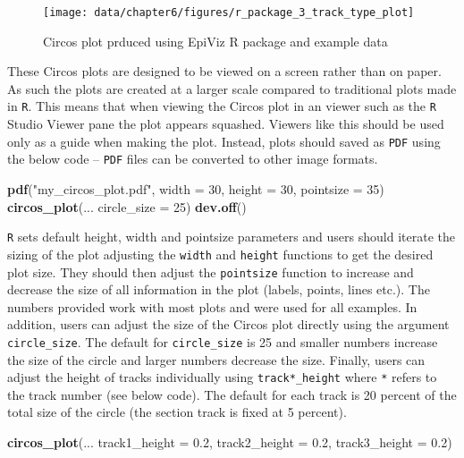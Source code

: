 \documentclass[11pt,twoside]{bristolthesis}
\newenvironment{Shaded}{\begin{snugshade}}{\end{snugshade}}
\newcommand{\DataTypeTok}[1]{\textcolor[rgb]{0.13,0.29,0.53}{#1}}
\newcommand{\DecValTok}[1]{\textcolor[rgb]{0.00,0.00,0.81}{#1}}
\newcommand{\FloatTok}[1]{\textcolor[rgb]{0.00,0.00,0.81}{#1}}
\newcommand{\KeywordTok}[1]{\textcolor[rgb]{0.13,0.29,0.53}{\textbf{#1}}}
\newcommand{\NormalTok}[1]{#1}
\newcommand{\StringTok}[1]{\textcolor[rgb]{0.31,0.60,0.02}{#1}}
\begin{document}
\begin{figure}
\texttt{[image: data/chapter6/figures/r\_package\_3\_track\_type\_plot]} \caption{Circos plot prduced using EpiViz R package and example data}\label{fig:r-package-3-track-type-plot}
\end{figure}
These Circos plots are designed to be viewed on a screen rather than on paper. As such the plots are created at a larger scale compared to traditional plots made in \texttt{R}. This means that when viewing the Circos plot in an viewer such as the \texttt{R} Studio Viewer pane the plot appears squashed. Viewers like this should be used only as a guide when making the plot. Instead, plots should saved as \texttt{PDF} using the below code -- \texttt{PDF} files can be converted to other image formats.
\begin{Shaded}
\begin{Highlighting}[]
\KeywordTok{pdf}\NormalTok{(}\StringTok{"my_circos_plot.pdf"}\NormalTok{,}
    \DataTypeTok{width =} \DecValTok{30}\NormalTok{, }\DataTypeTok{height =} \DecValTok{30}\NormalTok{, }\DataTypeTok{pointsize =} \DecValTok{35}\NormalTok{)}
\KeywordTok{circos_plot}\NormalTok{(...}
            \DataTypeTok{circle_size =} \DecValTok{25}\NormalTok{)}
\KeywordTok{dev.off}\NormalTok{()}
\end{Highlighting}
\end{Shaded}
\texttt{R} sets default height, width and pointsize parameters and users should iterate the sizing of the plot adjusting the \texttt{width} and \texttt{height} functions to get the desired plot size. They should then adjust the \texttt{pointsize} function to increase and decrease the size of all information in the plot (labels, points, lines etc.). The numbers provided work with most plots and were used for all examples. In addition, users can adjust the size of the Circos plot directly using the argument \texttt{circle\_size}. The default for \texttt{circle\_size} is 25 and smaller numbers increase the size of the circle and larger numbers decrease the size. Finally, users can adjust the height of tracks individually using \texttt{track*\_height} where \texttt{*} refers to the track number (see below code). The default for each track is 20 percent of the total size of the circle (the section track is fixed at 5 percent).
\begin{Shaded}
\begin{Highlighting}[]
\KeywordTok{circos_plot}\NormalTok{(...}
            \DataTypeTok{track1_height =} \FloatTok{0.2}\NormalTok{,}
            \DataTypeTok{track2_height =} \FloatTok{0.2}\NormalTok{,}
            \DataTypeTok{track3_height =} \FloatTok{0.2}\NormalTok{)}
\end{Highlighting}
\end{Shaded}
\end{document}

